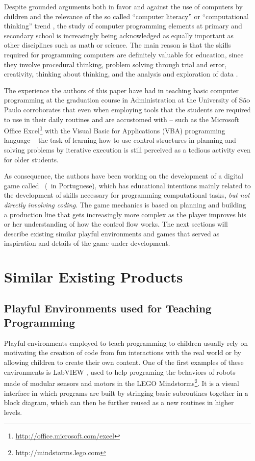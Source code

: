 \documentclass{sigchi}
\begin{document}
	Despite grounded arguments both in favor and against the use of computers by children \cite{Istrate2010,Setzer2001} and the relevance of the so called ``computer literacy'' or ``computational thinking'' trend \cite{Wing2006,Atwood2012}, the study of computer programming elements at primary and secondary school is increasingly being acknowledged as equally important as other disciplines such as math or science. The main reason is that the skills required for programming computers are definitely valuable for education, since they involve procedural thinking, problem solving through trial and error, creativity, thinking about thinking, and the analysis and exploration of data \cite{Kahn1999}.

	The experience the authors of this paper have had in teaching basic computer programming at the graduation course in Administration at the University of S\~ao Paulo corroborates that even when employing tools that the students are required to use in their daily routines and are accustomed with -- such as the Microsoft Office Excel\footnote{\url{http://office.microsoft.com/excel}} with the Visual Basic for Applications (VBA) programming language -- the task of learning how to use control structures in planning and solving problems by iterative execution is still perceived as a tedious activity even for older students.
	
	As consequence, the authors have been working on the development of a digital game called \gamename~(\gamenamept~in Portuguese), which has educational intentions mainly related to the development of skills necessary for programming computational tasks, \textit{but not directly involving coding}. The game mechanics is based on planning and building a production line that gets increasingly more complex as the player improves his or her understanding of how the control flow works. The next sections will describe existing similar playful environments and games that served as inspiration and details of the game under development.

\section{Similar Existing Products}

	\subsection{Playful Environments used for Teaching Programming}
		Playful environments employed to teach programming to children usually rely on motivating the creation of code from fun interactions with the real world or by allowing children to create their own content. One of the first examples of these environments is LabVIEW \cite{Erwin2000}, used to help programing the behaviors of robots made of modular sensors and motors in the LEGO Mindstorms\footnote{http://mindstorms.lego.com}. It is a visual interface in which programs are built by stringing basic subroutines together in a block diagram, which can then be further reused as a new routines in higher levels.
		
\end{document}
